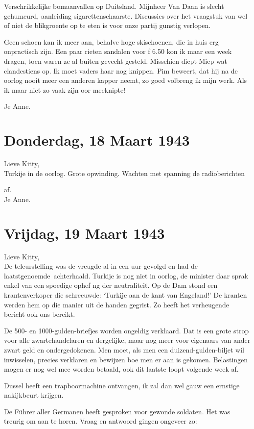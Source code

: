 \documentclass{book}
\begin{document}
Verschrikkelijke bomaanvallen op Duitsland. Mijnheer Van Daan is slecht
gehumeurd, aanleiding sigarettenschaarste. Discussies over het vraagstuk
van wel of niet de blikgroente op te eten is voor onze partij gunstig
verlopen.

Geen schoen kan ik meer aan, behalve hoge skischoenen, die in huis erg
onpractisch zijn. Een paar rieten sandalen voor ƒ 6.50 kon ik maar een
week dragen, toen waren ze al buiten gevecht gesteld. Misschien diept
Miep wat clandestiens op. Ik moet vaders haar nog knippen. Pim beweert,
dat hij na de oorlog nooit meer een anderen kapper neemt, zo goed
volbreng ik mijn werk. Als ik maar niet zo vaak zijn oor meeknipte!

Je Anne.

\chapter{Donderdag, 18 Maart 1943}

Lieve Kitty,\\Turkije in de oorlog. Grote opwinding. Wachten met
spanning de radioberichten

af.\\Je Anne.

\chapter{Vrijdag, 19 Maart 1943}

Lieve Kitty,\\De teleurstelling was de vreugde al in een uur gevolgd en
had de laatstgenoemde~achterhaald. Turkije is nog niet in oorlog, de
minister daar sprak enkel van een spoedige ophef ng der neutraliteit. Op
de Dam stond een krantenverkoper die schreeuwde: `Turkije aan de kant
van Engeland!' De kranten werden hem op die manier uit de handen
gegrist. Zo heeft het verheugende bericht ook ons bereikt.

De 500- en 1000-gulden-briefjes worden ongeldig verklaard. Dat is een
grote strop voor alle zwartehandelaren en dergelijke, maar nog meer voor
eigenaars van ander zwart geld en ondergedokenen. Men moet, als men een
duizend-gulden-biljet wil inwisselen, precies verklaren en bewijzen boe
men er aan is gekomen. Belastingen mogen er nog wel mee worden betaald,
ook dit laatste loopt volgende week af.

Dussel heeft een trapboormachine ontvangen, ik zal dan wel gauw een
ernstige nakijkbeurt krijgen.

De Führer aller Germanen heeft gesproken voor gewonde soldaten. Het was
treurig om aan te horen. Vraag en antwoord gingen ongeveer zo:
\end{document}
